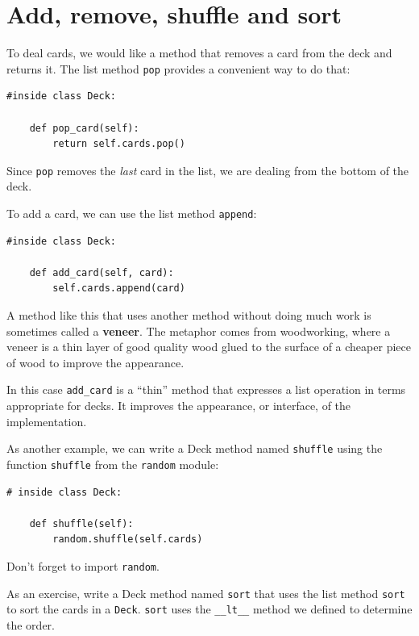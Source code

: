 \documentclass[10pt]{book}
\begin{document}
\section{Add, remove, shuffle and sort}

To deal cards, we would like a method that
removes a card from the deck and returns it.
The list method {\tt pop} provides a convenient way to do that:

\begin{verbatim}
#inside class Deck:

    def pop_card(self):
        return self.cards.pop()
\end{verbatim}
%
Since {\tt pop} removes the {\em last} card in the list, we are
dealing from the bottom of the deck.

To add a card, we can use the list method {\tt append}:

\begin{verbatim}
#inside class Deck:

    def add_card(self, card):
        self.cards.append(card)
\end{verbatim}
%
A method like this that uses another method without doing
much work is sometimes called a {\bf veneer}.  The metaphor
comes from woodworking, where a veneer is a thin
layer of good quality wood glued to the surface of a cheaper piece of
wood to improve the appearance.

In this case \verb"add_card" is a ``thin'' method that expresses
a list operation in terms appropriate for decks.  It
improves the appearance, or interface, of the
implementation.

As another example, we can write a Deck method named {\tt shuffle}
using the function {\tt shuffle} from the {\tt random} module:

\begin{verbatim}
# inside class Deck:
            
    def shuffle(self):
        random.shuffle(self.cards)
\end{verbatim}
%
Don't forget to import {\tt random}.

As an exercise, write a Deck method named {\tt sort} that uses the
list method {\tt sort} to sort the cards in a {\tt Deck}.  {\tt sort}
uses the \verb"__lt__" method we defined to determine the order.
 
\end{document}
